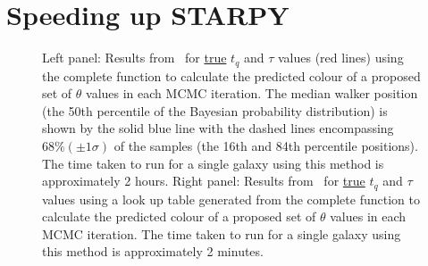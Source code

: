 \section{Speeding up STARPY}\label{lookuptable}

\begin{figure}
\caption[Comparing complete and look-up table versions of \starpy]{Left panel: Results from \starpy ~for \underline{true} $t_q$ and $\tau$ values (red lines) using the complete function to calculate the predicted colour of a proposed set of $\theta$ values in each MCMC iteration. The median walker position (the 50th percentile of the Bayesian probability distribution) is shown by the solid blue line with the dashed lines encompassing $68\% (\pm 1\sigma)$ of the samples (the 16th and 84th percentile positions). The time taken to run for a single galaxy using this method is approximately 2 hours. Right panel: Results from \starpy ~for \underline{true} $t_q$ and $\tau$ values using a look up table generated from the complete function to calculate the predicted colour of a proposed set of $\theta$ values in each MCMC iteration. The time taken to run for a single galaxy using this method is approximately 2 minutes.}
\label{lookup}
\end{figure}

